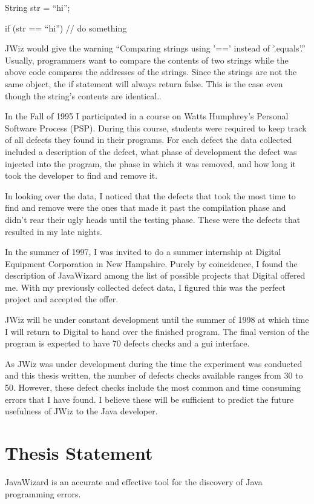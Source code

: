 String str = ``hi'';

if (str == ``hi'') { // do something }

JWiz would give the warning ``Comparing strings using '==' instead of
'.equals'.''  Usually, programmers want to compare the contents of two
strings while the above code compares the addresses of the strings.  Since
the strings are not the same object, the if statement will always return
false.  This is the case even though the string's contents are identical..

In the Fall of 1995 I participated in a course on Watts Humphrey's Personal
Software Process (PSP).  During this course, students were required to keep
track of all defects they found in their programs.  For each defect the
data collected included a description of the defect, what phase of
development the defect was injected into the program, the phase in which it
was removed, and how long it took the developer to find and remove it.

In looking over the data, I noticed that the defects that took the most
time to find and remove were the ones that made it past the compilation
phase and didn't rear their ugly heads until the testing phase.  These were
the defects that resulted in my late nights.

In the summer of 1997, I was invited to do a summer internship at Digital
Equipment Corporation in New Hampshire.  Purely by coincidence, I found the
description of JavaWizard among the list of possible projects that Digital
offered me.  With my previously collected defect data, I figured this was
the perfect project and accepted the offer.

JWiz will be under constant development until the summer of 1998 at which
time I will return to Digital to hand over the finished program.  The final
version of the program is expected to have 70 defects checks and a gui
interface.

As JWiz was under development during the time the experiment was conducted
and this thesis written, the number of defects checks available ranges from
30 to 50. However, these defect checks include the most common and time
consuming errors that I have found.  I believe these will be sufficient to
predict the future usefulness of JWiz to the Java developer.

\section{Thesis Statement} 
JavaWizard is an accurate and effective tool for the discovery of Java
programming errors.
